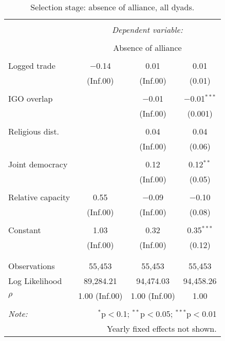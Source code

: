 \documentclass[10pt,]{article}
\begin{document}
\begin{table}[!htbp] \centering 
  \caption{\label{tab:AllySelectionAllDyads}Selection stage: absence of alliance, all dyads.} 
  \label{} 
\begin{tabular}{@{\extracolsep{5pt}}lccc} 
\\[-1.8ex]\hline 
\hline \\[-1.8ex] 
 & \multicolumn{3}{c}{\textit{Dependent variable:}} \\ 
\cline{2-4} 
\\[-1.8ex] & \multicolumn{3}{c}{Absence of alliance} \\ 
\hline \\[-1.8ex] 
 Logged trade & $-$0.14 & 0.01 & 0.01 \\ 
  & (Inf.00) & (Inf.00) & (0.01) \\ 
  & & & \\ 
 IGO overlap &  & $-$0.01 & $-$0.01$^{***}$ \\ 
  &  & (Inf.00) & (0.001) \\ 
  & & & \\ 
 Religious dist. &  & 0.04 & 0.04 \\ 
  &  & (Inf.00) & (0.06) \\ 
  & & & \\ 
 Joint democracy &  & 0.12 & 0.12$^{**}$ \\ 
  &  & (Inf.00) & (0.05) \\ 
  & & & \\ 
 Relative capacity & 0.55 & $-$0.09 & $-$0.10 \\ 
  & (Inf.00) & (Inf.00) & (0.08) \\ 
  & & & \\ 
 Constant & 1.03 & 0.32 & 0.35$^{***}$ \\ 
  & (Inf.00) & (Inf.00) & (0.12) \\ 
  & & & \\ 
\hline \\[-1.8ex] 
Observations & 55,453 & 55,453 & 55,453 \\ 
Log Likelihood & 89,284.21 & 94,474.03 & 94,458.26 \\ 
$\rho$ & 1.00  (Inf.00) & 1.00  (Inf.00) & 1.00 \\ 
\hline 
\hline \\[-1.8ex] 
\textit{Note:}  & \multicolumn{3}{r}{$^{*}$p$<$0.1; $^{**}$p$<$0.05; $^{***}$p$<$0.01} \\ 
 & \multicolumn{3}{r}{Yearly fixed effects not shown.} \\ 
\end{tabular} 
\end{table}
\end{document}

